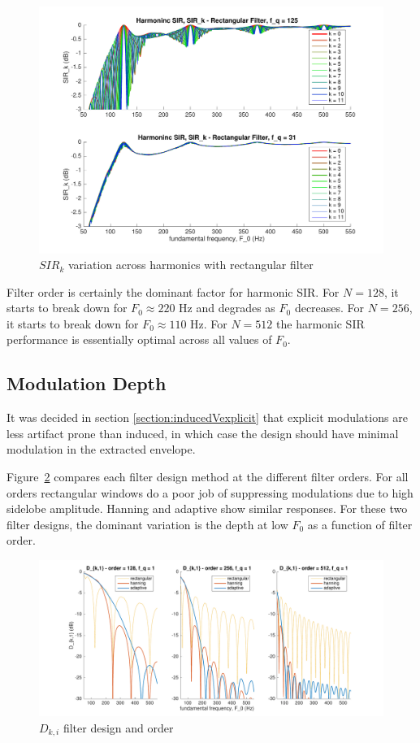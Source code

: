 \documentclass [11pt, proquest,oneside] {ganter_thesis}[2015/03/03]
\begin{document}
\begin{figure}[!ht]
  \centering
    \includegraphics[width=.7\textwidth]{sir_k_4}   
    \caption{$SIR_k$ variation across harmonics with rectangular filter}\label{fig:sir_k_4}
\end{figure}

Filter order is certainly the dominant factor for harmonic SIR.  For $N = 128$, it starts to break down for $F_0 \approx 220$ Hz and degrades as $F_0$ decreases.  For $N = 256$, it starts to break down for $F_0 \approx 110$ Hz.  For $N = 512$ the harmonic SIR performance is essentially optimal across all values of $F_0$.

\clearpage

\subsection{Modulation Depth}

It was decided in section \ref{section:inducedVexplicit} that explicit modulations are less artifact prone than induced, in which case the design should have minimal modulation in the extracted envelope.

Figure~\ref{fig:d_ki_1} compares each filter design method at the different filter orders.  For all orders rectangular windows do a poor job of suppressing modulations due to high sidelobe amplitude.  Hanning and adaptive show similar responses.  For these two filter designs, the dominant variation is the depth at low $F_0$ as a function of filter order.

\begin{figure}[!ht]
  \centering
    \includegraphics[width=1\textwidth]{d_ki_1}   
    \caption{$D_{k,i}$ filter design and order}\label{fig:d_ki_1}
\end{figure}
\end{document}
